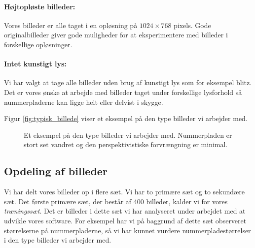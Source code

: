 \paragraph{Højtopløste billeder:}
Vores billeder er alle taget i en opløsning på $1024 \times 768$ pixels. Gode originalbilleder giver gode muligheder for at eksperimentere med billeder i forskellige opløsninger. 

\paragraph{Intet kunstigt lys:}
Vi har valgt at tage alle billeder uden brug af kunstigt lys som for eksempel blitz. Det er vores ønske at arbejde med billeder taget under forskellige lysforhold så nummerpladerne kan ligge helt eller delvist i skygge.  

Figur \vref{fig:typisk_billede} viser et eksempel på den type billeder vi arbejder med.

\begin{figure}[htp]
\centering
{} 
\caption{Et eksempel på den type billeder vi arbejder med. Nummerpladen er stort set vandret og den perspektivistiske forvrængning er minimal.}
\label{fig:typisk_billede}
\end{figure}

\subsection{Opdeling af billeder}
Vi har delt vores billeder op i flere sæt. Vi har to primære sæt og to sekundære sæt. Det første primære sæt, der består af 400 billeder, kalder vi for vores \textit{træningssæt}. Det er billeder i dette sæt vi har analyseret under arbejdet med at udvikle vores software. For eksempel har vi på baggrund af dette sæt observeret størrelserne på nummerpladerne, så vi har kunnet vurdere nummerpladestørrelser i den type billeder vi arbejder med.

